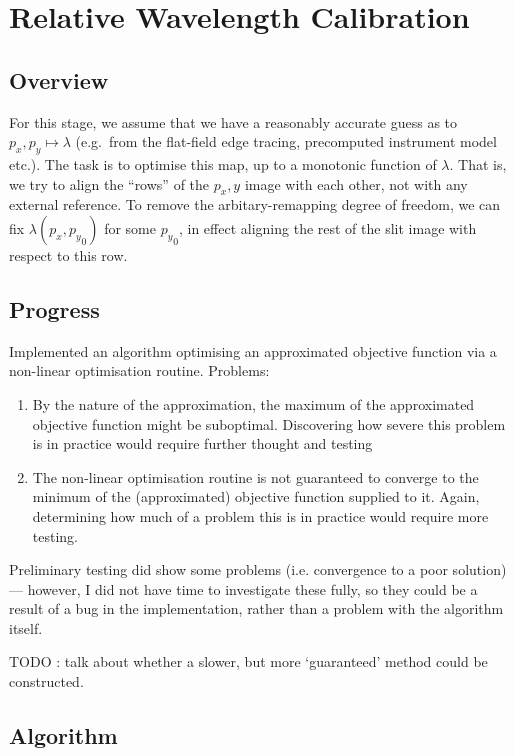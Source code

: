 \section{Relative Wavelength Calibration}
\label{sec:relativeWavelengthCalibration}

\subsection{Overview}

For this stage, we assume that we have a reasonably accurate guess as
to $p_x, p_y \mapsto \lambda$ (e.g.\ from the flat-field edge tracing,
precomputed instrument model etc.). The task is to optimise this map,
up to a monotonic function of $\lambda$. That is,
we try to align the ``rows'' of the $p_x, y$ image with each other, not
with any external reference. To remove the arbitary-remapping degree
of freedom, we can fix $\lambda(p_x, {p_y}_0)$ for some ${p_y}_0$, in
effect aligning the rest of the slit image with respect to this row.

\subsection{Progress}

Implemented an algorithm optimising an approximated objective function via
a non-linear optimisation routine. Problems:
\begin{enumerate}
\item By the nature of the approximation, the maximum of the
approximated objective function might be suboptimal. Discovering how
severe this problem is in practice would require further thought and
testing
\item The non-linear optimisation routine is not guaranteed to converge
to the minimum of the (approximated) objective function supplied to
it. Again, determining how much of a problem this is in practice would
require more testing.
\end{enumerate}
Preliminary testing did show some problems (i.e. convergence to a poor
solution) --- however, I did not have time to investigate these fully,
so they could be a result of a bug in the implementation, rather than
a problem with the algorithm itself.

TODO : talk about whether a slower, but more `guaranteed' method could
be constructed.

\subsection{Algorithm}

